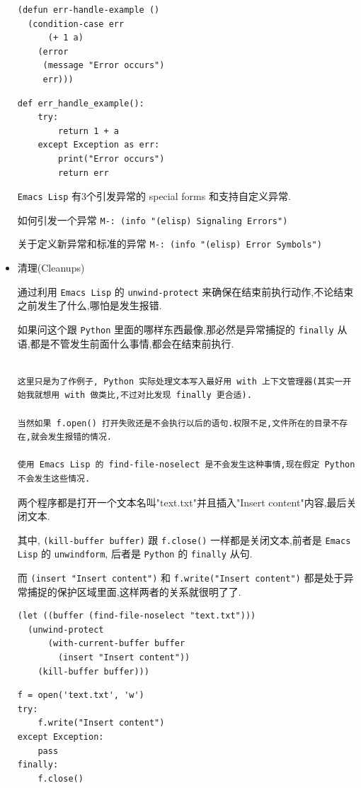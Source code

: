 \documentclass[11pt]{article}
\begin{document}
\begin{itemize}
\begin{verbatim}
(defun err-handle-example ()
  (condition-case err
      (+ 1 a)
    (error
     (message "Error occurs")
     err)))
\end{verbatim}

\begin{verbatim}
def err_handle_example():
    try:
        return 1 + a
    except Exception as err:
        print("Error occurs")
        return err
\end{verbatim}

\texttt{Emacs Lisp} 有3个引发异常的 special forms 和支持自定义异常.

如何引发一个异常 \texttt{M-: (info "(elisp) Signaling Errors")}

关于定义新异常和标准的异常 \texttt{M-: (info "(elisp) Error Symbols")}

\item 清理(Cleanups)

通过利用 \texttt{Emacs Lisp} 的 \texttt{unwind-protect} 来确保在结束前执行动作,不论结束之前发生了什么,哪怕是发生报错.

如果问这个跟 \texttt{Python} 里面的哪样东西最像,那必然是异常捕捉的 \texttt{finally} 从语,都是不管发生前面什么事情,都会在结束前执行.

\begin{verbatim}

这里只是为了作例子, Python 实际处理文本写入最好用 with 上下文管理器(其实一开始我就想用 with 做类比,不过对比发现 finally 更合适).

当然如果 f.open() 打开失败还是不会执行以后的语句.权限不足,文件所在的目录不存在,就会发生报错的情况.

使用 Emacs Lisp 的 find-file-noselect 是不会发生这种事情,现在假定 Python 不会发生这些情况.

\end{verbatim}

两个程序都是打开一个文本名叫"text.txt"并且插入"Insert content"内容,最后关闭文本.

其中, \texttt{(kill-buffer buffer)} 跟 \texttt{f.close()} 一样都是关闭文本,前者是 \texttt{Emacs Lisp} 的 \texttt{unwindform}, 后者是 \texttt{Python} 的 \texttt{finally} 从句.

而 \texttt{(insert "Insert content")} 和 \texttt{f.write("Insert content")} 都是处于异常捕捉的保护区域里面,这样两者的关系就很明了了.

\begin{verbatim}
(let ((buffer (find-file-noselect "text.txt")))
  (unwind-protect
      (with-current-buffer buffer
        (insert "Insert content"))
    (kill-buffer buffer)))
\end{verbatim}

\begin{verbatim}
f = open('text.txt', 'w')
try:
    f.write("Insert content")
except Exception:
    pass
finally:
    f.close()
\end{verbatim}
\end{itemize}
\end{document}
